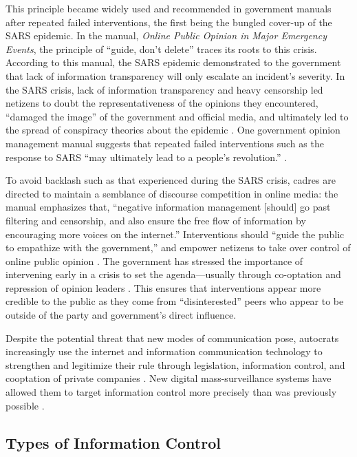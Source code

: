 \documentclass[11pt]{article}
\begin{document}
This principle became widely used and recommended in government manuals after repeated failed interventions, the first being the bungled cover-up of the SARS epidemic. In the manual, {\it Online Public Opinion in Major Emergency Events}, the principle of ``guide, don’t delete'' traces its roots to this crisis. According to this manual, the SARS epidemic demonstrated to the government that lack of information transparency will only escalate an incident’s severity. In the SARS crisis, lack of information transparency and heavy censorship led netizens to doubt the representativeness of the opinions they encountered, ``damaged the image'' of the government and official media, and ultimately led to the spread of conspiracy theories about the epidemic \citep[1-36]{gong2012zhongda}. One government opinion management manual suggests that repeated failed interventions such as the response to SARS ``may ultimately lead to a people’s revolution.'' \citep[259-273]{ren2013yulun}.

To avoid backlash such as that experienced during the SARS crisis, cadres are directed to maintain a semblance of discourse competition in online media: the manual emphasizes that, ``negative information management [should] go past filtering and censorship, and also ensure the free flow of information by encouraging more voices on the internet.'' Interventions should ``guide the public to empathize with the government,'' and empower netizens to take over control of online public opinion \citep[12-15]{zou2015wangluo}. The government has stressed the importance of intervening early in a crisis to set the agenda---usually through co-optation and repression of opinion leaders \citep[180-194][]{zeng2015wangluo,zhou2011weibo}. This ensures that interventions appear more credible to the public as they come from ``disinterested'' peers who appear to be outside of the party and government's direct influence.

Despite the potential threat that new modes of communication pose, autocrats increasingly use the internet and information communication technology to strengthen and legitimize their rule through legislation, information control, and cooptation of private companies \citep{lessig1999code}. New digital mass-surveillance systems have allowed them to target information control more precisely than was previously possible \citep{shahbaz2018freedom}.

\subsection{Types of Information Control}\label{types_info_ctrl}
\end{document}
